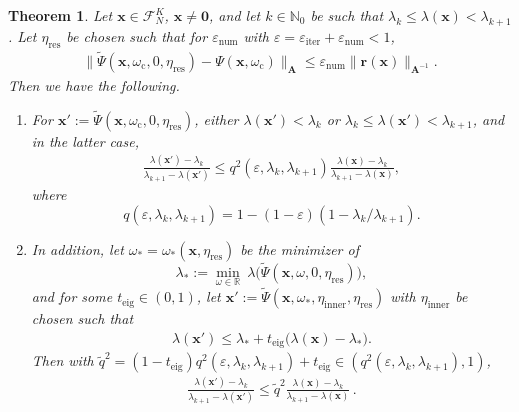 \documentclass[a4paper,11pt,oneside]{amsart}
\newtheorem{theorem}{Theorem}
\theoremstyle{definition}
\theoremstyle{remark}
\newcommand{\A}{\ten A}
\newcommand{\R}{\mathbb{R}}
\newcommand{\N}{\mathbb{N}}
\newcommand{\ten}[1]{\boldsymbol{#1}}
\newcommand{\enum}{\ensuremath{\varepsilon_{\mathrm{num}}}}
\newcommand{\eiter}{\ensuremath{\varepsilon_{\mathrm{iter}}}}
\newcommand{\etain}{\eta_{\mathrm{inner}}}
\newcommand{\etares}{\eta_{\mathrm{res}}}
\newcommand{\teig}{t_{\mathrm{eig}}}
\numberwithin{equation}{section}
\numberwithin{theorem}{section}
\begin{document}
\begin{theorem}\label{thm:conv}
 Let $\ten x \in \mathcal{F}_N^K$, $\ten x \neq \ten 0$, and let $k \in \N_0$ be such that $\lambda_k \leq \lambda(\ten x) < \lambda_{k+1}$. Let $\etares$ be chosen such that for $\enum$ with $\varepsilon = \eiter + \enum < 1$, 
 \begin{align}\label{eq:enumcond}
  \|\tilde \Psi(\ten x, \omega_{\mathrm{c}}, 0, \etares) - \Psi(\ten x, \omega_{\mathrm{c}})\|_{\A} \leq \enum \| \ten r(\ten x) \|_{\A^{-1}}.
 \end{align}
 Then we have the following.
 \begin{enumerate}[{\rm\bf(i)}]
\item For $\ten x' := \tilde \Psi(\ten x, \omega_{\mathrm{c}},  0, \etares)$, either $\lambda(\ten x') < \lambda_k$ or $\lambda_k \leq \lambda(\ten x') < \lambda_{k+1}$, and in the latter case, 
 \begin{align}\label{eq:qred}
  \frac{\lambda(\ten x') - \lambda_k}{\lambda_{k+1} - \lambda(\ten x')} \leq q^2(\varepsilon, \lambda_k, \lambda_{k+1}) \frac{\lambda(\ten x) - \lambda_k}{\lambda_{k+1} - \lambda(\ten x)},
 \end{align}
where
\[ 
 q(\varepsilon, \lambda_k, \lambda_{k+1}) = 1 - (1-\varepsilon)(1 - \lambda_k / \lambda_{k+1}).
\]
\item In addition, let $\omega_\ast = \omega_\ast(\ten x, \etares)$ be the minimizer of
 \begin{equation*}
  \lambda_\ast := \min_{\omega \in \R}\ \lambda \bigl(\tilde \Psi(\ten x, \omega, 0, \etares)\bigr),
 \end{equation*}
and for some $\teig \in (0,1)$, let $\ten x' := \tilde \Psi(\ten x, \omega_\ast, \etain, \etares)$ with $\etain$ be chosen such that
\begin{align}\label{eq:modqcond}
 \lambda (\ten x') \leq \lambda_\ast + \teig \bigl(\lambda(\ten x) - \lambda_\ast \bigr).
\end{align}
Then with $ \tilde q^2 = (1-\teig)q^2(\varepsilon, \lambda_k, \lambda_{k+1}) +\teig \in (q^2(\varepsilon, \lambda_k, \lambda_{k+1}),1)$,
\begin{align*}
    \frac{\lambda(\ten x') - \lambda_k}{\lambda_{k+1} - \lambda(\ten x')} \leq \tilde q^2 \frac{\lambda(\ten x) - \lambda_k}{\lambda_{k+1} - \lambda(\ten x)}\,.
\end{align*}

\end{enumerate}
\end{theorem}
\end{document}
